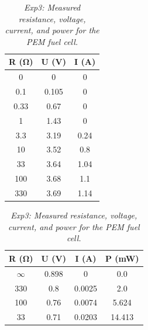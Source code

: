 \begin{table}[H]
    \centering
    \begin{minipage}{0.45\textwidth}
        \centering
        \caption{\textit{Exp1: Measured resistance, voltage, and current for the water electrolyzer.}}
        \renewcommand{\arraystretch}{1.4} %
        \setlength{\tabcolsep}{8pt} %
        \begin{tabular}{|c|c|c|}
            \hline
            \textbf{R (\si{\ohm})} & \textbf{U (\si{\volt})} & \textbf{I (\si{\ampere})} \\
            \hline
            0 & 0 & 0 \\
            \hline
            0.1 & 0.105 & 0 \\
            \hline
            0.33 & 0.67 & 0 \\
            \hline
            1 & 1.43 & 0 \\
            \hline  
            3.3 & 3.19 & 0.24 \\
            \hline
            10 & 3.52 & 0.8 \\
            \hline
            33 & 3.64 & 1.04 \\
            \hline
            100 & 3.68 & 1.1 \\
            \hline
            330 & 3.69 & 1.14 \\
            \hline
        \end{tabular}
        \label{tab:exp1_results}
    \end{minipage}
    \hfill
    \begin{minipage}{0.45\textwidth}
        \centering
        \caption{\textit{Exp3: Measured resistance, voltage, current, and power for the PEM fuel cell.}}
        \renewcommand{\arraystretch}{1.4} %
        \setlength{\tabcolsep}{8pt} %
        \begin{tabular}{|c|c|c|c|}
                    \hline
                    \textbf{R (\si{\ohm})} & \textbf{U (\si{\volt})} & \textbf{I (\si{\ampere})} & \textbf{P (\si{\milli\watt})} \\
                    \hline
                    $\infty$ & 0.898 & 0 & 0.0 \\
                    \hline
                    330 & 0.8 & 0.0025 & 2.0 \\
                    \hline
                    100 & 0.76 & 0.0074 & 5.624 \\
                    \hline
                    33 & 0.71 & 0.0203 & 14.413 \\

\end{tabular}
\end{minipage}
\end{table}
